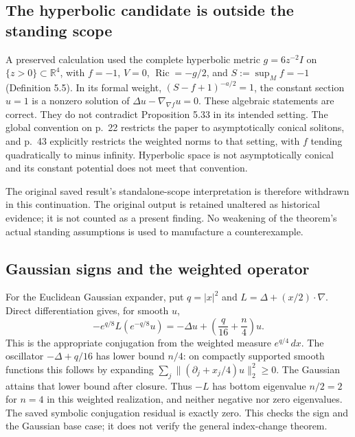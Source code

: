 \documentclass[10pt]{article}
\begin{document}
\subsection*{The hyperbolic candidate is outside the standing scope}
A preserved calculation used the complete hyperbolic metric \(g=6z^{-2}I\) on \(\{z>0\}\subset\mathbb R^4\), with \(f=-1\), \(V=0\), \(\operatorname{Ric}=-g/2\), and \(S:=\sup_M f=-1\) (Definition 5.5). In its formal weight, \((S-f+1)^{-a/2}=1\), the constant section \(u=1\) is a nonzero solution of \(\Delta u-\nabla_{\nabla f}u=0\). These algebraic statements are correct. They do not contradict Proposition 5.33 in its intended setting. The global convention on p. 22 restricts the paper to asymptotically conical solitons, and p. 43 explicitly restricts the weighted norms to that setting, with \(f\) tending quadratically to minus infinity. Hyperbolic space is not asymptotically conical and its constant potential does not meet that convention.\par
The original saved result’s standalone-scope interpretation is therefore withdrawn in this continuation. The original output is retained unaltered as historical evidence; it is not counted as a present finding. No weakening of the theorem’s actual standing assumptions is used to manufacture a counterexample.\par
\subsection*{Gaussian signs and the weighted operator}
For the Euclidean Gaussian expander, put \(q=|x|^2\) and \(L=\Delta+(x/2)\cdot\nabla\). Direct differentiation gives, for smooth \(u\), \[-e^{q/8}L(e^{-q/8}u)
   =-\Delta u+\left(\frac{q}{16}+\frac n4\right)u .\] This is the appropriate conjugation from the weighted measure \(e^{q/4}\,dx\). The oscillator \(-\Delta+q/16\) has lower bound \(n/4\): on compactly supported smooth functions this follows by expanding \(\sum_j\|(\partial_j+x_j/4)u\|_2^2\geq0\). The Gaussian attains that lower bound after closure. Thus \(-L\) has bottom eigenvalue \(n/2=2\) for \(n=4\) in this weighted realization, and neither negative nor zero eigenvalues. The saved symbolic conjugation residual is exactly zero. This checks the sign and the Gaussian base case; it does not verify the general index-change theorem.\par
\end{document}
